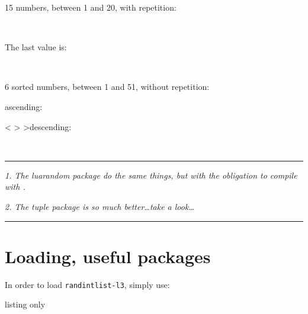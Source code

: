 \documentclass[11pt,a4paper]{ltxdoc}
\begin{document}
\begin{tcolorbox}[colframe=lightgray,colback=lightgray!5]
15 numbers, between 1 and 20, with repetition:

\hfill\rdlgenlist[min=1,max=20,nb=15,repeat]{\mylist}\textcolor{red}{\mylist}\hfill~

The last value is:

\hfill\textcolor{blue}{}\hfill~
\end{tcolorbox}

\begin{tcolorbox}[colframe=lightgray,colback=lightgray!5]
6 sorted numbers, between 1 and 51, without repetition:

\hfill\rdlgenlist[min=1,max=51,nb=6,sort=asc,repeat=false]{\mylist}ascending: \textcolor{red}{\mylist}\hfill~

\hfill\rdlgenlist[min=1,max=51,nb=6,sort=des,repeat=false]< {>} >{\mylist}descending: \textcolor{red}{\mylist}\hfill~
\end{tcolorbox}

\vfill~

\hrule

\medskip

\emph{%
	1. The \textsf{luarandom} package do the same things, but with the obligation to compile with .
}

\emph{%
	2. The \textsf{tuple} package is so much better\ldots take a look\ldots
}

\medskip

\hrule

\vspace*{5mm}

\pagebreak


\hypertarget{matoc}{}

\tableofcontents

\vspace*{5mm}


\pagebreak

\section{Loading, useful packages}

In order to load \texttt{randintlist-l3}, simply use:

\begin{DemoCode}{listing only}
\usepackage{randintlist-l3}
\end{DemoCode}
\end{document}
